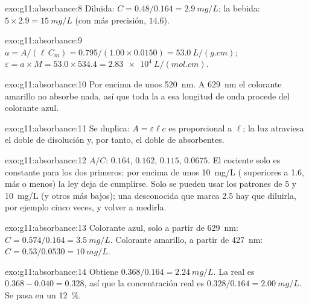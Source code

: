 \begin{solution}{exo:g11:absorbance:8}
Diluida: $C = 0.48 / 0.164 = \qty{2.9}{mg/L}$; la bebida:
$5 \times 2.9 = \qty{15}{mg/L}$ (con más precisión, $14.6$).
\end{solution}

\begin{solution}{exo:g11:absorbance:9}
$a = A / (\ell\, C_m) = 0.795 / (1.00 \times 0.0150) = \qty{53.0}{L/(g.cm)}$;
$\varepsilon = a \times M = 53.0 \times 534.4 = \qty{2.83e4}{L/(mol.cm)}$.
\end{solution}

\begin{solution}{exo:g11:absorbance:10}
Por encima de unos \qty{520}{nm}. A \qty{629}{nm} el colorante amarillo
no absorbe nada, así que toda la  a esa longitud de onda
procede del colorante azul.
\end{solution}

\begin{solution}{exo:g11:absorbance:11}
Se duplica: $A = \varepsilon \ell c$ es proporcional a $\ell$; la luz
atraviesa el doble de disolución y, por tanto, el doble de 
absorbentes.
\end{solution}

\begin{solution}{exo:g11:absorbance:12}
$A/C$: $0.164$, $0.162$, $0.115$, $0.0675$. El cociente solo es
constante para los dos primeros: por encima de unos \qty{10}{mg/L}
( superiores a 1.6, más o menos) la ley deja de cumplirse.
Solo se pueden usar los patrones de 5 y \qty{10}{mg/L} (y otros más
bajos); una desconocida que marca 2.5 hay que diluirla, por ejemplo
cinco veces, y volver a medirla.
\end{solution}

\begin{solution}{exo:g11:absorbance:13}
Colorante azul, solo a partir de \qty{629}{nm}:
$C = 0.574 / 0.164 = \qty{3.5}{mg/L}$. Colorante amarillo, a partir de
\qty{427}{nm}: $C = 0.53 / 0.0530 = \qty{10}{mg/L}$.
\end{solution}

\begin{solution}{exo:g11:absorbance:14}
Obtiene $0.368 / 0.164 = \qty{2.24}{mg/L}$. La  real es
$0.368 - 0.040 = 0.328$, así que la concentración real es
$0.328 / 0.164 = \qty{2.00}{mg/L}$. Se pasa en un \qty{12}{\percent}.
\end{solution}

